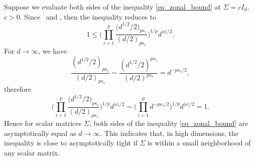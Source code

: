 \documentclass[pdftex]{sigma}
\numberwithin{equation}{section}
\begin{document}
\begin{Remark}
\label{rem_zonal_bound}
Suppose we evaluate both sides of the inequality \eqref{eq_zonal_bound} at $\Sigma = c I_d$, $c > 0$. Since~ and , then the inequality reduces to
\begin{equation}
\label{eq_zonal_bound_BR}
1 \le \Bigg(\prod_{i=1}^p \frac{\bigl(d^{1/2}/2\bigr)_{p \kappa_i}}{(d/2)_{p \kappa_i}}\Bigg)^{1/p} d^{|\kappa|/2}.
\end{equation}
For $d \to \infty$, we have
\[
\frac{(d^{1/2}/2)_{p \kappa_i}}{(d/2)_{p \kappa_i}} \sim \frac{(d^{1/2}/2)^{p \kappa_i}}{(d/2)^{p \kappa_i}} = d^{-p \kappa_i/2},
\]
therefore
\[
\Bigg(\prod_{i=1}^p \frac{\bigl(d^{1/2}/2\bigr)_{p \kappa_i}}{(d/2)_{p \kappa_i}}\Bigg)^{1/p} d^{|\kappa|/2} \sim \Bigg(\prod_{i=1}^p d^{-p \kappa_i/2}\Bigg)^{1/p} d^{|\kappa|/2} = 1.
\]
Hence for scalar matrices $\Sigma$, both sides of the inequality \eqref{eq_zonal_bound} are asymptotically equal as ${d \to \infty}$. This indicates that, in high dimensions, the inequality is close to asymptotically tight if $\Sigma$ is within a small neighborhood of any scalar matrix.
\end{Remark}
\end{document}
